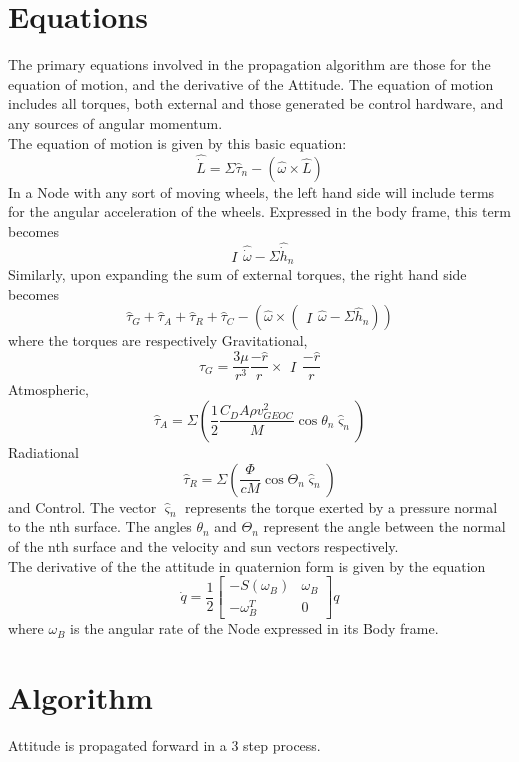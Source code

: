 \documentclass[12pt,letterpaper]{report}
\begin{document}
\section{Equations}
The primary equations involved in the propagation algorithm are those for the equation of motion, and the derivative of the Attitude. The equation of motion includes all torques, both external and those generated be control hardware, and any sources of angular momentum.
\\

The equation of motion is given by this basic equation:
\[\hat{\dot{L}}=\Sigma\hat{\tau}_{n} - (\hat{\omega} \times \hat{L})\]
In a Node with any sort of moving wheels, the left hand side will include terms for the angular acceleration of the wheels. Expressed in the body frame, this term becomes \[\begin{matrix}I\end{matrix} \hat{\dot{\omega}} - \Sigma\hat{\dot{h}}_{n}\] Similarly, upon expanding the sum of external torques, the right hand side becomes
\[\hat{\tau}_{G} + \hat{\tau}_{A} + \hat{\tau}_{R} + \hat{\tau}_{C} - (\hat{\omega} \times ( \begin{matrix}I\end{matrix} \hat{\omega} - \Sigma\hat{h}_{n}))\]
where the torques are respectively Gravitational,
\[\hat{\tau}_{G} = \dfrac{3\mu}{r^{3}}\dfrac{-\hat{r}}{r} \times \begin{matrix}I\end{matrix} \dfrac{-\hat{r}}{r}\]
Atmospheric,
\[\hat{\tau}_{A} = \Sigma\left(\dfrac{1}{2}\dfrac{C_{D}A\rho v_{GEOC}^{2}}{M}\cos \theta_{n}\hat{\varsigma}_{n}\right)\]
Radiational
\[\hat{\tau}_{R} = \Sigma\left(\dfrac{\Phi}{cM}\cos \Theta_{n}\hat{\varsigma}_{n}\right)\]
and Control. The vector $\hat{\varsigma}_{n}$ represents the torque exerted by a pressure normal to the nth surface. The angles $\theta_{n}$ and $\Theta_{n}$ represent the angle between the normal of the nth surface and the velocity and sun vectors respectively.
\\

The derivative of the the attitude in quaternion form is given by the equation
\[\dot{q} = \frac{1}{2}\left[\begin{matrix}
-S(\omega_{B})&\omega_{B}\\
-\omega_{B}^{T}&0
\end{matrix}\right]q\]
where $\omega_{B}$ is the angular rate of the Node expressed in its Body frame.
\section{Algorithm}
Attitude is propagated forward in a 3 step process.
\\
\end{document}
